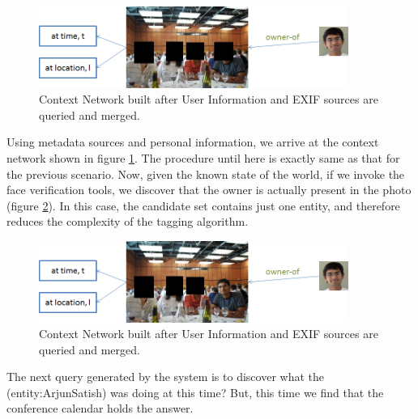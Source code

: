 \begin{figure}[h]
\centering
\includegraphics[width=0.9\textwidth]{media/chapter4/stacktrace/vldb-network-1.png}
\caption{Context Network built after User Information and EXIF sources are queried and merged.}
\label{fig:vldb-exif-network}
\end{figure}

Using metadata sources and personal information, we arrive at the context network shown in figure \ref{fig:vldb-exif-network}. The procedure until here is exactly same as that for the previous scenario. Now, given the known state of the world, if we invoke the face verification tools, we discover that the owner is actually present in the photo (figure \ref{fig:vldb-network-2}). In this case, the candidate set contains just one entity, and therefore reduces the complexity of the tagging algorithm.

\begin{figure}[h]
\centering
\includegraphics[width=0.9\textwidth]{media/chapter4/stacktrace/vldb-network-2.png}
\caption{Context Network built after User Information and EXIF sources are queried and merged.}
\label{fig:vldb-network-2}
\end{figure}

The next query generated by the system is to discover what the (entity:ArjunSatish) was doing at this time? But, this time we find that the conference calendar holds the answer.

